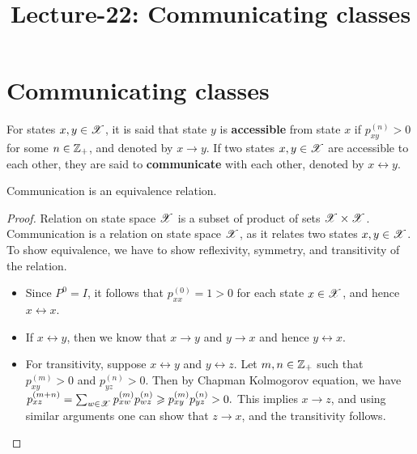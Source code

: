\documentclass[letterpaper,10pt,english]{article}
\title{ Lecture-22: Communicating classes}
\author{}
\begin{document}
\maketitle

\section{Communicating classes}
\begin{defn}
For states $x, y \in \mathscr{X}$, 
it is said that state $y$ is \textbf{accessible} from state $x$ if $p_{xy}^{(n)} > 0$ for some $n \in \mathbb{Z}_+$, and denoted by $x \to y$. 
If two states $x,y \in \mathscr{X}$ are accessible to each other, they are said to \textbf{communicate} with each other, denoted by $x \leftrightarrow y$. 
\end{defn}
\begin{prop}
Communication is an equivalence relation. 
\end{prop}
\begin{proof} 
Relation on state space $\mathscr{X}$ is a subset of product of sets $\mathscr{X} \times \mathscr{X}$. 
Communication is a relation on state space $\mathscr{X}$, as it relates two states $x,y \in \mathscr{X}$. 
To show equivalence, we have to show reflexivity, symmetry, and transitivity of the relation. 
\begin{itemize}
\item [Reflexivity:] Since $P^0 = I$, it follows that $p_{xx}^{(0)} = 1 > 0$ for each state $x\in\mathscr{X}$, and hence $x\leftrightarrow x$. %
\item [Symmetry:] If $x \leftrightarrow y$, then we know that $x \to y$ and $y \to x$ and hence $y \leftrightarrow x$. 
\item [Transitivity:] For transitivity, suppose $x \leftrightarrow y$ and $y \leftrightarrow z$. 
Let $m,n \in \mathbb{Z}_+$ such that $p_{xy}^{(m)} >0$ and $p_{yz}^{(n)} >0$. 
Then by Chapman Kolmogorov equation, we have
$
p_{xz}^{(m+n)} = \sum_{w \in \mathscr{X}} p_{xw}^{(m)}p_{wz}^{(n)} \geqslant p_{xy}^{(m)}p_{yz}^{(n)} > 0. 
$
This implies $x \to z$, and using similar arguments one can show that $z \to x$, and the transitivity follows.  
\end{itemize}
\end{proof}
\end{document}
